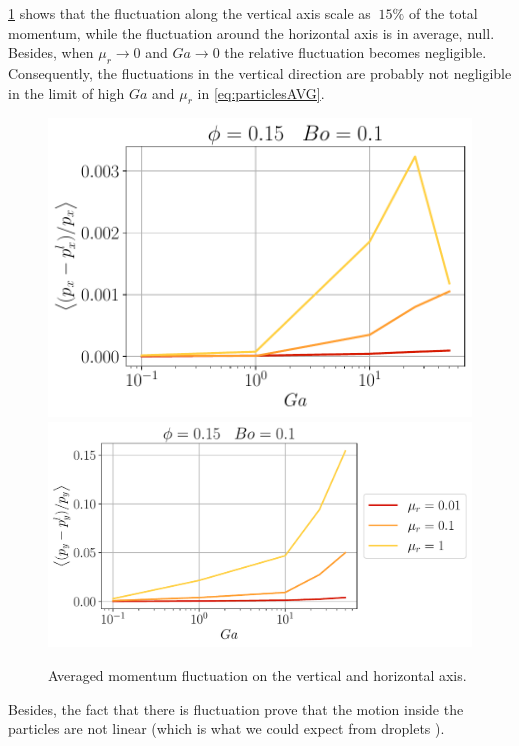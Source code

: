 \ref{fig:velfluc} shows that the fluctuation along the vertical axis scale as $~15\%$ of the total momentum, while the fluctuation around the horizontal axis is in average, null.
Besides, when $\mu_r \rightarrow 0$ and $Ga \rightarrow 0$ the relative fluctuation becomes negligible. 
Consequently, the fluctuations in the vertical direction are probably not negligible in the limit of high $Ga$ and $\mu_r$ in \ref{eq:particlesAVG}. 
\begin{figure}[h!]
    \centering
    \includegraphics[height = 0.3 \textwidth]{image/LINEAR/pl/x_Bo_0_1_PHI_0_15.pdf}
    \includegraphics[height = 0.3 \textwidth]{image/LINEAR/pl/y_Bo_0_1_PHI_0_15.pdf}
    \caption{Averaged momentum fluctuation on the vertical and horizontal axis.}
    \label{fig:velfluc}
\end{figure}
Besides, the fact that there is fluctuation prove that the motion inside the particles are not linear (which is what we could expect from droplets ).

